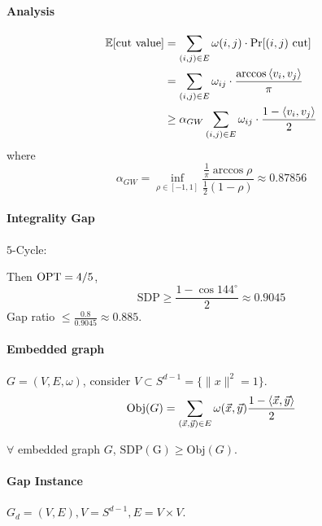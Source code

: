 
\paragraph{Analysis}
\[\begin{aligned}
    \mathbb E[\text{cut value}]&=\sum_{(i,j)\in E}\omega(i,j)\cdot\mathrm{Pr}[(i,j)\text{ cut}]\\
    &=\sum_{(i,j)\in E}\omega_{ij}\cdot\frac{\arccos\left<v_i,v_j\right>}{\pi}\\
    & \geq \alpha_{GW}\sum_{(i,j)\in E}\omega_{ij}\cdot\frac{1-\left<v_i,v_j\right>}{2}
\end{aligned}\]
where 
\[\alpha_{GW}=\inf_{\rho\in[-1,1]}\frac{\frac{1}{\pi}\arccos\rho}{\frac{1}{2}(1-\rho)}\approx 0.87856\]

\paragraph{Integrality Gap}

$ 5 $-Cycle:

\begin{center}
\end{center}

Then  $ \mathrm{OPT}=4/5 $, 
\[\mathrm{SDP} \geq \frac{1-\cos 144^\circ}{2}\approx 0.9045\]
Gap ratio  $  \leq \frac{0.8}{0.9045}\approx 0.885 $.

\paragraph{Embedded graph}  $ G=(V,E, \omega) $, consider  $ V\subset S^{d-1}=\{\|x\|^2=1\} $.
\[\mathrm{Obj}(G)=\sum_{(\vec{x},\vec{y})\in E}\omega(\vec{x},\vec{y})\frac{1-\left<\vec{x},\vec{y}\right>}{2}\]
\begin{fact}
    $ \forall  $ embedded graph  $ G $,  $ \mathrm{SDP(G)} \geq \mathrm{Obj}(G) $. 
\end{fact}  

\paragraph{Gap Instance}  $G_d=(V,E), V=S^{d-1},E=V\times V $.

